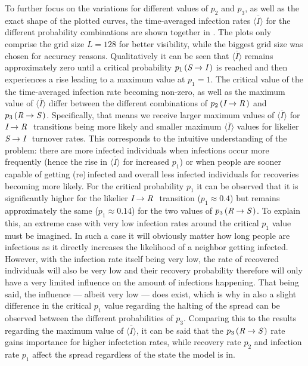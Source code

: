 To further focus on the variations for different values of $p_2$ and $p_3$, as well as the exact shape of the plotted curves, the time-averaged infection rates $\overline{\langle I\rangle}$ for the different probability 
combinations are shown together in . The plots only comprise the grid size $L=128$ for better visibility, while the biggest grid size was chosen for accuracy reasons. 
Qualitatively it can be seen that $\overline{\langle I\rangle}$ remains approximately zero until a critical probability $p_1\left(\textit{S}\rightarrow\textit{I}\,\right)$ is reached and then
experiences a rise leading to a maximum value at $p_1=1$. The critical value of the the time-averaged infection rate becoming non-zero, as well as the maximum value of $\overline{\langle I\rangle}$ 
differ between the different combinations of $p_2\left(\textit{I}\rightarrow\textit{R}\,\right)$ and $p_3\left(\textit{R}\rightarrow\textit{S}\,\right)$. Specifically, that means we receive larger maximum values
of $\overline{\langle I\rangle}$ for $\textit{I}\rightarrow\textit{R}~$ transitions being more likely and smaller maximum $\overline{\langle I\rangle}$ values for likelier $\textit{S}\rightarrow\textit{I}~$
turnover rates. This corresponds to the intuitive understanding of the problem: there are more infected individuals when infections occur more frequently (hence the rise in $\overline{\langle I\rangle}$ for increased $p_1$) 
or when people are sooner capable of getting (re)\,infected and overall less infected individuals for recoveries becoming more likely. For the critical probability $p_1$ it can be observed that
it is significantly higher for the likelier $\textit{I}\rightarrow\textit{R}~$ transition ($p_1\approx 0.4$) but remains approximately the same ($p_1\approx 0.14$) for the two values of 
$p_3\left(\textit{R}\rightarrow\textit{S}\,\right)$. 
To explain this, an extreme case with very low infection rates around the critical $p_1$ value must be imagined. In such a case it will obviously matter how long people are infectious as it directly increases the likelihood
of a neighbor getting infected. However, with the infection rate itself being very low, the rate of recovered individuals will also be very low and their recovery probability therefore will only have a very limited influence
on the amount of infections happening. That being said, the influence --- albeit very low --- does exist, which is why in  also a slight difference in the critical $p_1$ value
regarding the halting of the spread can be observed between the different probabilities of $p_3$.\newline
Comparing this to the results regarding the maximum value of $\overline{\langle I\rangle}$, it can be said that the $p_3\left(\textit{R}\rightarrow\textit{S}\,\right)$ rate 
gains importance for higher infectction rates, while recovery rate $p_2$ and infection rate $p_1$ affect the spread regardless of the state the model is in.

